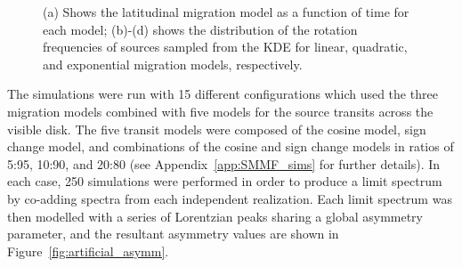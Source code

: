 \begin{figure}[!ht]
	\qquad
	
	\caption{(a) Shows the latitudinal migration model as a function of time for each model; (b)-(d) shows the distribution of the rotation frequencies of sources sampled from the KDE for linear, quadratic, and exponential migration models, respectively.}
	\label{fig:artificial_sim_plots}
\end{figure}

The simulations were run with 15 different configurations which used the three migration models combined with five models for the source transits across the visible disk. The five transit models were composed of the cosine model, sign change model, and combinations of the cosine and sign change models in ratios of 5:95, 10:90, and 20:80 (see Appendix~\ref{app:SMMF_sims} for further details). In each case, 250 simulations were performed in order to produce a limit spectrum by co-adding spectra from each independent realization. Each limit spectrum was then modelled with a series of Lorentzian peaks sharing a global asymmetry parameter, and the resultant asymmetry values are shown in Figure~\ref{fig:artificial_asymm}.

